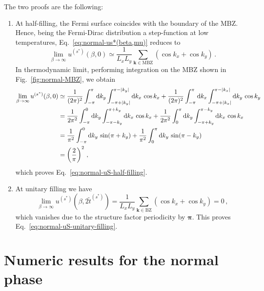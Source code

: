 \begin{tabproof}

	The two proofs are the following:
	\begin{enumerate}
		\item At half-filling, the Fermi surface coincides with the boundary of the MBZ. Hence, being the Fermi-Dirac distribution a step-function at low temperatures, Eq.~\eqref{eq:normal-us*(beta,mu)} reduces to
		\[
			\lim_{\beta \to \infty} u^{(s^*)}(\beta,0) \simeq \frac{1}{L_x L_y} \sum_{\mathbf{k}\in\mathrm{MBZ}} (\cos k_x + \cos k_y) \, .
		\]
		In thermodynamic limit, performing integration on the MBZ shown in Fig.~\ref{fig:normal-MBZ}, we obtain
		\[
		\begin{aligned}
			\lim_{\beta \to \infty} u^{(s^*)}(\beta,0) &\simeq \frac{1}{(2\pi)^2} \int_{-\pi}^{\pi} \mathrm{d} k_y \int_{-\pi+\abs{k_y}}^{\pi-\abs{k_y}} \mathrm{d} k_x\, \cos k_x + \frac{1}{(2\pi)^2} \int_{-\pi}^{\pi} \mathrm{d} k_x \int_{-\pi+\abs{k_x}}^{\pi-\abs{k_x}} \mathrm{d} k_y\, \cos k_y \\
			&= \frac{1}{2\pi^2} \int_{-\pi}^{0} \mathrm{d} k_y \int_{-\pi-k_y}^{\pi+k_y} \mathrm{d} k_x\, \cos k_x + \frac{1}{2\pi^2} \int_{0}^{\pi} \mathrm{d} k_y \int_{-\pi+k_y}^{\pi-k_y} \mathrm{d} k_x\, \cos k_x \\
			&= \frac{1}{\pi^2} \int_{-\pi}^{0} \mathrm{d} k_y\, \sin (\pi+k_y) + \frac{1}{\pi^2} \int_{0}^{\pi} \mathrm{d} k_y\, \sin (\pi-k_y) \\ 
			&= \left( \frac{2}{\pi} \right)^2 \, ,
		\end{aligned}
		\]
		which proves Eq.~\eqref{eq:normal-uS-half-filling}.
		\item At unitary filling we have
		\[
			\lim_{\beta \to \infty} u^{(s^*)}\left(
				\beta,2\tilde{t}^{(s^*)}
			\right) = \frac{1}{L_x L_y} \sum_{\mathbf{k}\in\mathrm{BZ}} (\cos k_x + \cos k_y) = 0 \, ,
		\]
		which vanishes due to the structure factor periodicity by $\bm{\pi}$. This proves Eq.~\eqref{eq:normal-uS-unitary-filling}.
	\end{enumerate}
\end{tabproof}

\section{Numeric results for the normal phase}\label{sec:normal-numeric}


